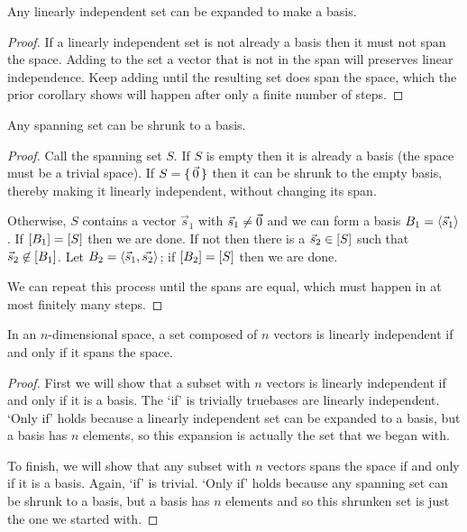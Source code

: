 \begin{corollary} \label{cor:LIExpBas}
Any linearly independent set can be expanded to make a basis.
\end{corollary}

\begin{proof}
If a linearly independent set 
is not already a basis then it must not span the space.
Adding to the set a vector that is not in the span 
will preserves linear independence.
Keep adding until the resulting set does span the space, 
which the prior corollary
shows will happen after only a finite number of steps.
\end{proof}

\begin{corollary}
Any spanning set can be shrunk to a basis.
\end{corollary}

\begin{proof}
Call the spanning set \( S \).
If \( S \) is empty then it is already a basis (the space must be a trivial
space).
If \( S=\mbox{$\{\,\vec{0}\,\}$} \) then it can be shrunk to the empty basis,
thereby making it linearly independent, without changing its span.

Otherwise, $S$ contains a vector $\vec{s}_1$ with $\vec{s}_1\neq\vec{0}$
and we can form a basis \( B_1=\langle\vec{s}_1\rangle \).
If \( \relax [B_1\relax ]=\relax [S\relax ] \) then we are done.
If not then there is a \( \vec{s}_2\in\relax [S\relax ] \) such that
\( \vec{s}_2\not\in\relax [B_1\relax ] \).
Let \( B_2=\langle\vec{s}_1,\vec{s_2}\rangle \);
if \( \relax [B_2\relax ]=\relax [S\relax ] \) then we are done.

We can repeat this process until the spans are equal,
which must happen in at most finitely many steps.
\end{proof}

\begin{corollary}
\label{cor:NVecsRNSpanIffLI}
In an \( n \)-dimensional space, a set composed of \( n \) vectors is linearly 
independent if and
only if it spans the space.
\end{corollary}

\begin{proof}
First we will
show that a subset with \( n \) vectors is linearly independent if and only
if it is a basis.
The `if' is trivially true\Dash bases are linearly independent.
`Only if' holds
because a linearly independent set can be expanded to a basis, but a
basis has \( n \) elements, so this 
expansion is actually the set that we began with.

To finish, we will show that any subset with \( n \) vectors spans the space 
if and only if it is a basis.
Again, `if' is trivial.
`Only if'
holds because any spanning set can be shrunk to a basis, but a basis has
\( n \) elements and so this shrunken set is just the one we started with.
\end{proof}

